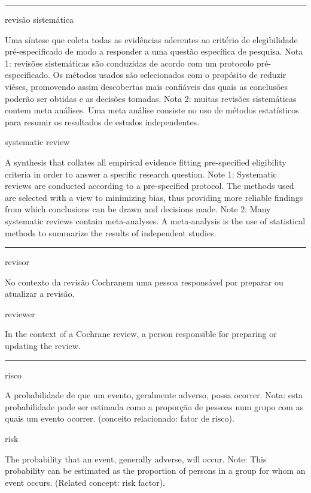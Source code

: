 \documentclass[
]{book}
\begin{document}
\begin{center}\rule{0.5\linewidth}{0.5pt}\end{center}

revisão sistemática

Uma síntese que coleta todas as evidências aderentes ao critério de elegibilidade pré-especificado de modo a responder a uma questão específica de pesquisa. Nota 1: revisões sistemáticas são conduzidas de acordo com um protocolo pré-especificado. Os métodos usados são selecionados com o propósito de reduzir viéses, promovendo assim descobertas mais confiáveis das quais as conclusões poderão ser obtidas e as decisões tomadas. Nota 2: muitas revisões sistemáticas contem meta análises. Uma meta análise consiste no uso de métodos estatísticos para resumir os resultados de estudos independentes.

systematic review

A synthesis that collates all empirical evidence fitting pre-specified eligibility criteria in order to answer a specific research question. Note 1: Systematic reviews are conducted according to a pre-specified protocol. The methods used are selected with a view to minimizing bias, thus providing more reliable findings from which conclusions can be drawn and decisions made. Note 2: Many systematic reviews contain meta-analyses. A meta-analysis is the use of statistical methods to summarize the results of independent studies.

\begin{center}\rule{0.5\linewidth}{0.5pt}\end{center}

revisor

No contexto da revisão Cochranem uma pessoa responsável por preparar ou atualizar a revisão.

reviewer

In the context of a Cochrane review, a person responsible for preparing or updating the review.

\begin{center}\rule{0.5\linewidth}{0.5pt}\end{center}

risco

A probabilidade de que um evento, geralmente adverso, possa ocorrer. Nota: esta probabilidade pode ser estimada como a proporção de pessoas num grupo com as quais um evento ocorrer. (conceito relacionado: fator de risco).

risk

The probability that an event, generally adverse, will occur. Note: This probability can be estimated as the proportion of persons in a group for whom an event occurs. (Related concept: risk factor).
\end{document}
